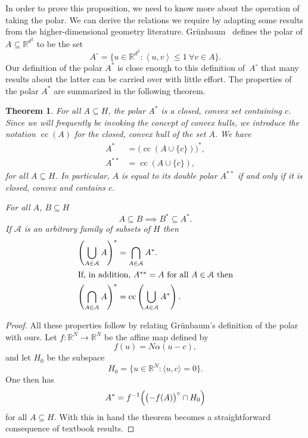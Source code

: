 \documentclass[aps,pra,superscriptaddress,10pt,tightenlines,twocolumn,nofootinbib]{revtex4}
\newtheorem{theorem}{Theorem}
\theoremstyle{remark}
\newcommand{\be}{\begin{equation}}
\newcommand{\ee}{\end{equation}}
\newcommand{\ea}[1]{\begin{align}#1\end{align}}
\newcommand{\fd}[1]{\mathbb{#1}}
\newcommand{\la}{\langle}
\newcommand{\ra}{\rangle}
\newcommand{\dl}[1]{#1^{*}}
\newcommand{\ddl}[1]{#1^{**}}
\newcommand{\inprod}[2]{{\left\langle #1 , #2 \right\rangle}}
\DeclareMathOperator{\cc}{cc}
\begin{document}
In order to prove this proposition, we need to know more about the operation of taking the polar.  We can derive the relations we require by adapting some results from the higher-dimensional geometry literature.  Gr\"unbaum~\cite{grun} defines the polar of $A\subseteq
\fd{R}^{d^2}$ to be the set
\be
A^{\circ} = \{ u \in \fd{R}^{d^2} \colon \inprod{u}{v} \le 1 \ \forall v \in A\}.
\ee
Our definition of the polar $\dl{A}$ is close enough to this definition of~$A^{\circ}$ that many results about the latter can be carried over with little effort.
The properties of the polar $\dl{A}$ are summarized in the following theorem.
\begin{theorem}
\label{tm:polarity}
For all $A\subseteq H$, the polar $\dl{A}$ is a closed, convex  set containing $c$.  Since we will frequently be invoking the concept of convex hulls, we introduce the notation $\cc(A)$ for the closed, convex hull of the set $A$.  We have
\ea{
\dl{A} & =  \dl{\bigl(\cc(A\cup \{c\})\bigr)},
\\
\ddl{A} &= \cc(A\cup \{c\}),
}
for all $A\subseteq H$.  In particular, $A$ is equal to its double polar $\ddl{A}$ if and only if it is closed, convex and contains $c$.


For  all $A$, $B\subseteq H$
\be
A\subseteq B \implies \dl{B} \subseteq \dl{A}.
\ee
If $\mathcal{A}$ is an arbitrary family of subsets of $H$ then
\ea{
\dl{\left(\bigcup_{A\in \mathcal{A}} A \right)} &= \bigcap_{A\in \mathcal{A}} \dl{A}.
\label{eq:dualUnionB}
\\
\intertext{If, in addition, $\ddl{A}=A$ for all $A\in\mathcal{A}$ then}
\dl{\left(\bigcap_{A\in \mathcal{A}} A \right)} &=\cc\left( \bigcup_{A\in \mathcal{A}} \dl{A}\right).
\label{eq:dualIntersectionB}
}
\end{theorem}
\begin{proof}
All these properties follow by relating Gr\"unbaum's definition of the
polar with ours.  Let  $f\colon \fd{R}^{N} \to \fd{R}^{N}$ be the affine map defined by
\be
f(u) = N\alpha (u-c),
\ee
and let $H_0$ be the subspace
\be
H_0 = \{ u\in \fd{R}^{N} \colon \la u, c \ra = 0\}.
\ee
One then has
\be
\dl{A} = f^{-1} \Bigl( \bigl(-f(A)\bigr)^{\circ}\cap H_0\Bigr)
\ee
for all $A\subseteq H$.  With this in hand the theorem becomes a
straightforward consequence of textbook results.
\end{proof}
\end{document}
